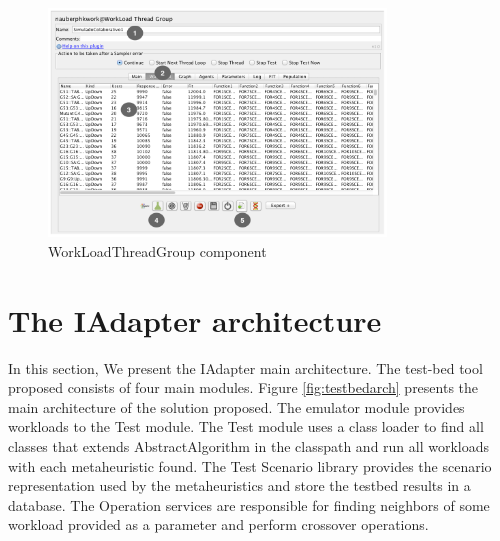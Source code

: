 \documentclass[espaco=umemeio,chapter=TITLE,twoside,openright]{abnt}
\begin{document}
\begin{figure}[h]
\centering
\includegraphics[width=0.8\textwidth]{./images/tela1iadapter.png}
\caption{WorkLoadThreadGroup component}
\label{fig:tela1iadapter}
\end{figure}

\vspace*{-.075in}
\section{The IAdapter architecture}
\label{sec:technique}
\vspace*{-.075in}


In this section, We present the IAdapter main architecture. The test-bed tool proposed consists of four main modules.  Figure \ref{fig:testbedarch} presents the main architecture of the solution proposed. The emulator module provides workloads to the Test module. The Test module uses a class loader to find all classes that extends AbstractAlgorithm in the classpath and run all workloads with each metaheuristic found. The Test Scenario library provides the scenario representation used by the metaheuristics and store the testbed results in a database. The Operation services are responsible for finding neighbors of some workload provided as a parameter and perform crossover operations.
\end{document}
